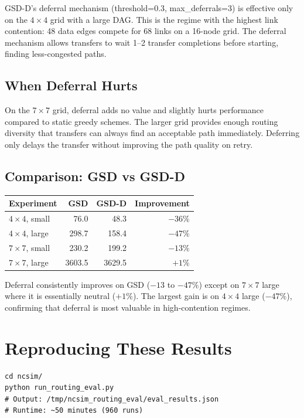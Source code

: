 \documentclass[11pt]{article}
\begin{document}
GSD-D's deferral mechanism (threshold=0.3, max\_deferrals=3) is effective
only on the $4\times4$ grid with a large DAG.  This is the regime with the
highest link contention: 48 data edges compete for 68 links on a 16-node
grid.  The deferral mechanism allows transfers to wait 1--2 transfer
completions before starting, finding less-congested paths.

\subsection{When Deferral Hurts}

On the $7\times7$ grid, deferral adds no value and slightly hurts
performance compared to static greedy schemes.  The larger grid provides
enough routing diversity that transfers can always find an acceptable path
immediately.  Deferring only delays the transfer without improving the path
quality on retry.

\subsection{Comparison: GSD vs GSD-D}

\begin{table}[h]
\centering
\begin{tabular}{lrrr}
\toprule
\textbf{Experiment} & \textbf{GSD} & \textbf{GSD-D} & \textbf{Improvement} \\
\midrule
$4\times4$, small &   76.0 &   48.3 & $-36\%$ \\
$4\times4$, large &  298.7 &  158.4 & $-47\%$ \\
$7\times7$, small &  230.2 &  199.2 & $-13\%$ \\
$7\times7$, large & 3603.5 & 3629.5 & $+1\%$  \\
\bottomrule
\end{tabular}
\end{table}

Deferral consistently improves on GSD ($-13$ to $-47\%$) except on
$7\times7$ large where it is essentially neutral ($+1\%$).  The largest
gain is on $4\times4$ large ($-47\%$), confirming that deferral is most
valuable in high-contention regimes.

\section{Reproducing These Results}

\begin{lstlisting}
cd ncsim/
python run_routing_eval.py
# Output: /tmp/ncsim_routing_eval/eval_results.json
# Runtime: ~50 minutes (960 runs)
\end{lstlisting}
\end{document}
